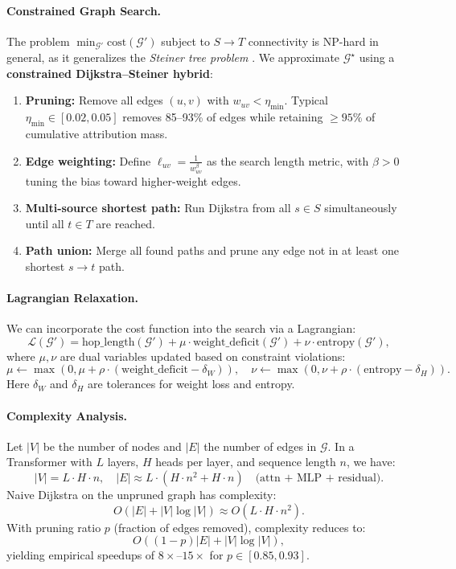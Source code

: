 \documentclass[11pt]{article}
\begin{document}
\paragraph{Constrained Graph Search.}
The problem $\min_{\mathcal{G}'} \mathrm{cost}(\mathcal{G}')$ subject to $S \to T$ connectivity is NP-hard in general, as it generalizes the \emph{Steiner tree problem} \citep{hwang1992steiner}.  
We approximate $\mathcal{G}^\star$ using a \textbf{constrained Dijkstra–Steiner hybrid}:

\begin{enumerate}
    \item \textbf{Pruning:} Remove all edges $(u,v)$ with $w_{uv} < \eta_{\min}$.  
    Typical $\eta_{\min} \in [0.02,0.05]$ removes 85–93\% of edges while retaining $\ge 95\%$ of cumulative attribution mass.
    \item \textbf{Edge weighting:} Define $\ell_{uv} = \frac{1}{w_{uv}^\beta}$ as the search length metric, with $\beta > 0$ tuning the bias toward higher-weight edges.
    \item \textbf{Multi-source shortest path:} Run Dijkstra from all $s \in S$ simultaneously until all $t \in T$ are reached.
    \item \textbf{Path union:} Merge all found paths and prune any edge not in at least one shortest $s \to t$ path.
\end{enumerate}

\paragraph{Lagrangian Relaxation.}
We can incorporate the cost function into the search via a Lagrangian:
\[
\mathcal{L}(\mathcal{G}') = \mathrm{hop\_length}(\mathcal{G}') + \mu \cdot \mathrm{weight\_deficit}(\mathcal{G}') + \nu \cdot \mathrm{entropy}(\mathcal{G}'),
\]
where $\mu, \nu$ are dual variables updated based on constraint violations:
\[
\mu \leftarrow \max(0, \mu + \rho \cdot (\mathrm{weight\_deficit} - \delta_W)), \quad
\nu \leftarrow \max(0, \nu + \rho \cdot (\mathrm{entropy} - \delta_H)).
\]
Here $\delta_W$ and $\delta_H$ are tolerances for weight loss and entropy.

\paragraph{Complexity Analysis.}
Let $|V|$ be the number of nodes and $|E|$ the number of edges in $\mathcal{G}$.  
In a Transformer with $L$ layers, $H$ heads per layer, and sequence length $n$, we have:
\[
|V| = L \cdot H \cdot n, \quad |E| \approx L \cdot (H \cdot n^2 + H \cdot n) \quad \text{(attn + MLP + residual)}.
\]
Naive Dijkstra on the unpruned graph has complexity:
\[
O(|E| + |V| \log |V|) \approx O(L \cdot H \cdot n^2).
\]
With pruning ratio $p$ (fraction of edges removed), complexity reduces to:
\[
O((1-p)|E| + |V| \log |V|),
\]
yielding empirical speedups of $8\times$–$15\times$ for $p \in [0.85, 0.93]$.
\end{document}
